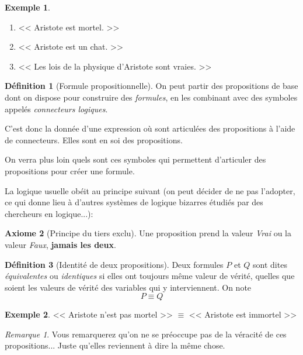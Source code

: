 \documentclass[11pt]{article}
\theoremstyle{definition}
\newtheorem{defn}{Définition}[section]
\newtheorem{axio}[defn]{Axiome}
\newtheorem{exe}{Exemple}
\theoremstyle{remark}
\newtheorem{rem}{Remarque}
\begin{document}
\begin{exe}\leavevmode
\begin{enumerate}
\item << Aristote est mortel. >>
\item << Aristote est un chat. >>
\item << Les lois de la physique d'Aristote sont vraies. >>
\end{enumerate}
\end{exe}

\begin{defn}[Formule propositionnelle]
On peut partir des propositions de base dont on dispose pour construire des \textit{formules}, en les combinant avec des symboles appelés \textit{connecteurs logiques}.

C'est donc la donnée d'une expression où sont articulées des propositions à l'aide de connecteurs. Elles sont en soi des propositions.
\end{defn}

On verra plus loin quels sont ces symboles qui permettent d'articuler des propositions pour créer une formule.



La logique usuelle obéit au principe suivant (on peut décider de ne pas l'adopter, ce qui donne lieu à d'autres systèmes de logique bizarres étudiés par des chercheurs en logique...):

\begin{axio}[Principe du tiers exclu]
Une proposition prend la valeur \textit{Vrai} ou la valeur \textit{Faux}, \textbf{jamais les deux}.
\end{axio}

\begin{defn}[Identité de deux propositions]
Deux formules $P$ et $Q$ sont dites \textit{équivalentes} ou \textit{identiques} si elles ont toujours même valeur de vérité, quelles que soient les valeurs de vérité des variables qui y interviennent. On note
\[P\equiv Q
\]
\end{defn}

\begin{exe}\leavevmode
<< Aristote n'est pas mortel >> $\equiv$ << Aristote est immortel >>
\end{exe}

\begin{rem}Vous remarquerez qu'on ne se préoccupe pas de la véracité de ces propositions... Juste qu'elles reviennent à dire la même chose.
\end{rem}
\end{document}

